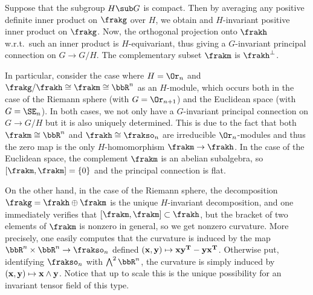 \begin{example}
    Suppose that the subgroup $H\sub G$ is compact. Then by averaging any positive definite inner product on $\frakg$ over $H$, we obtain and $H$-invariant positive inner product on $\frakg$. Now, the orthogonal projection onto $\frakh$ w.r.t.\ such an inner product is $H$-equivariant, thus giving a $G$-invariant principal connection on $G\to G\slash H$. The complementary subset $\frakm$ is $\frakh^\perp$.

    In particular, consider the case where $H=\Or_n$ and $\frakg\slash\frakh\cong \frakm\cong \bbR^n$ as an $H$-module, which occurs both in the case of the Riemann sphere (with $G=\Or_{n+1}$) and the Euclidean space (with $G=\SE_n$). In both cases, we not only have a $G$-invariant principal connection on $G\to G\slash H$ but it is also uniquely determined. This is due to the fact that both $\frakm\cong\bbR^n$ and $\frakh\cong \frakso_n$ are irreducible $\Or_n$-modules and thus the zero map is the only $H$-homomorphism $\frakm\to \frakh$. In the case of the Euclidean space, the complement $\frakm$ is an abelian subalgebra, so $[\frakm,\frakm]=\{0\}$ and the principal connection is flat.

    On the other hand, in the case of the Riemann sphere, the decomposition $\frakg=\frakh\oplus\frakm$ is the unique $H$-invariant decomposition, and one immediately verifies that $[\frakm,\frakm]\subset\frakh$, but the bracket of two elements of $\frakm$ is nonzero in general, so we get nonzero curvature. More precisely, one easily computes that the curvature is induced by the map $\bbR^n\times\bbR^n\to \frakso_n$ defined $(\bf{x},\bf{y})\mapsto \bf{x}\bf{y}^T-\bf{y}\bf{x}^T$. Otherwise put, identifying $\frakso_n$ with $\bigwedge^2\bbR^n$, the curvature is simply induced by $(\bf{x},\bf{y})\mapsto \bf{x}\wedge \bf{y}$. Notice that up to scale this is the unique possibility for an invariant tensor field of this type.
 \end{example}

